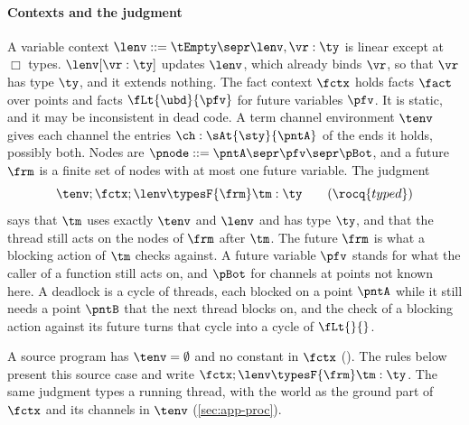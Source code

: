\paragraph{Contexts and the judgment}
A variable context $\lenv ::= \tEmpty \sepr \lenv, \vr : \ty$ is
linear except at $\Box$ types. $\lenv[\vr : \ty]$ updates $\lenv$, which
already binds $\vr$, so that $\vr$ has type $\ty$, and it extends
nothing. The fact context $\fctx$ holds facts $\fact$ over points and
facts $\fLt{\ubd}{\pfv}$ for future variables $\pfv$. It is static, and
it may be inconsistent in dead code. A term channel environment $\tenv$
gives each channel the entries $\ch : \sAt{\sty}{\pntA}$ of the ends it
holds, possibly both. Nodes are $\pnode ::= \pntA \sepr \pfv \sepr
\pBot$, and a future $\frm$ is a finite set of nodes with at most one
future variable. The judgment
\[
  \tenv ; \fctx ; \lenv \typesF{\frm} \tm : \ty
  \qquad(\rocq{typed})
\]
says that $\tm$ uses exactly $\tenv$ and $\lenv$ and has type $\ty$, and
that the thread still acts on the nodes of $\frm$ after $\tm$. The future
$\frm$ is what a blocking action of $\tm$ checks against. A future
variable $\pfv$ stands for what the caller of a function still acts on,
and $\pBot$ for channels at points not known here. A deadlock is a cycle
of threads, each blocked on a point $\pntA$ while it still needs a point
$\pntB$ that the next thread blocks on, and the check of a blocking
action against its future turns that cycle into a cycle of $\fLt{}{}$.

A source program has $\tenv = \emptyset$ and no constant in $\fctx$
(). The rules below present this source case and write
$\fctx ; \lenv \typesF{\frm} \tm : \ty$. The same judgment types a
running thread, with the world as the ground part of $\fctx$ and its
channels in $\tenv$ (\cref{sec:app-proc}).

